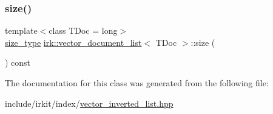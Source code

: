 \subsubsection{\texorpdfstring{size()}{size()}}
{\footnotesize\ttfamily template$<$class T\+Doc  = long$>$ \\
\mbox{\hyperlink{classirk_1_1vector__document__list_ac9387bd9f5dc89b638b6295858a9268c}{size\+\_\+type}} \mbox{\hyperlink{classirk_1_1vector__document__list}{irk\+::vector\+\_\+document\+\_\+list}}$<$ T\+Doc $>$\+::size (\begin{DoxyParamCaption}{ }\end{DoxyParamCaption}) const\hspace{0.3cm}{\ttfamily [inline]}}



The documentation for this class was generated from the following file\+:\begin{DoxyCompactItemize}
\item 
include/irkit/index/\mbox{\hyperlink{vector__inverted__list_8hpp}{vector\+\_\+inverted\+\_\+list.\+hpp}}\end{DoxyCompactItemize}
